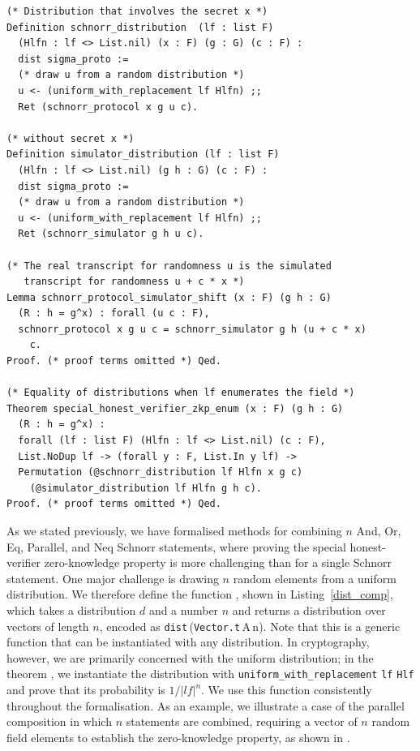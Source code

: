 \documentclass[sigconf,anonymous,review]{acmart}
\begin{document}
\begin{lstlisting}[frame=single, language=Coq, caption={Special Honest-Verifier Zero-Knowledge Proof},
  label={def_zero},captionpos=t, basicstyle=\ttfamily\footnotesize,
  abovecaptionskip=-\medskipamount]
(* Distribution that involves the secret x *)
Definition schnorr_distribution  (lf : list F) 
  (Hlfn : lf <> List.nil) (x : F) (g : G) (c : F) : 
  dist sigma_proto :=
  (* draw u from a random distribution *)
  u <- (uniform_with_replacement lf Hlfn) ;;
  Ret (schnorr_protocol x g u c).

(* without secret x *)
Definition simulator_distribution (lf : list F) 
  (Hlfn : lf <> List.nil) (g h : G) (c : F) : 
  dist sigma_proto :=
  (* draw u from a random distribution *)
  u <- (uniform_with_replacement lf Hlfn) ;;
  Ret (schnorr_simulator g h u c).

(* The real transcript for randomness u is the simulated 
   transcript for randomness u + c * x *)
Lemma schnorr_protocol_simulator_shift (x : F) (g h : G) 
  (R : h = g^x) : forall (u c : F), 
  schnorr_protocol x g u c = schnorr_simulator g h (u + c * x)
    c.
Proof. (* proof terms omitted *) Qed.

(* Equality of distributions when lf enumerates the field *)
Theorem special_honest_verifier_zkp_enum (x : F) (g h : G) 
  (R : h = g^x) : 
  forall (lf : list F) (Hlfn : lf <> List.nil) (c : F),
  List.NoDup lf -> (forall y : F, List.In y lf) ->
  Permutation (@schnorr_distribution lf Hlfn x g c) 
    (@simulator_distribution lf Hlfn g h c).
Proof. (* proof terms omitted *) Qed. 
\end{lstlisting}

As we stated previously, we have formalised methods for combining $n$ And, Or, Eq, Parallel, and Neq Schnorr statements, where proving the special honest-verifier zero-knowledge property is more challenging than for a single Schnorr statement. One major challenge is drawing $n$ random elements from a uniform distribution. We therefore define the function \texttt{}, shown in Listing~\ref{dist_comp}, which takes a distribution $d$ and a number $n$ and returns a distribution over vectors of length $n$, encoded as \texttt{dist}\,(\texttt{Vector.t}\,A\,n). Note that this is a generic function that can be instantiated with any distribution. In cryptography, however, we are primarily concerned with the uniform distribution; in the theorem \texttt{}, we instantiate the distribution with \texttt{uniform\_with\_replacement} \texttt{lf} \texttt{Hlf} and prove that its probability is $1/|lf|^n$. We use this function consistently throughout the formalisation. As an example, we illustrate a case of the parallel composition in which $n$ statements are combined, requiring a vector of $n$ random field elements to establish the zero-knowledge property, as shown in \texttt{}.
\end{document}

